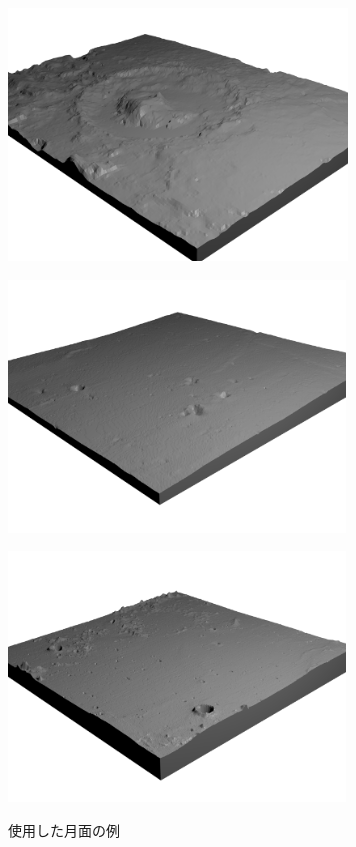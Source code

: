 \begin{figure}[htbp]
\begin{minipage}[b]{0.48\linewidth}
      \label{fig:NASA_moon3}
    \end{minipage}
    \begin{minipage}[b]{0.48\linewidth}
      \centering
      \includegraphics[keepaspectratio, scale=0.6]{images/NASA_moon5.png}
      \label{fig:NASA_moon5}
    \end{minipage}
    \begin{minipage}[b]{0.48\linewidth}
        \centering
        \includegraphics[keepaspectratio, scale=0.6]{images/NASA_moon6.png}
        \label{fig:NASA_moon6}
      \end{minipage}
      \begin{minipage}[b]{0.48\linewidth}
        \centering
        \includegraphics[keepaspectratio, scale=0.6]{images/NASA_moon7.png}
        \label{fig:NASA_moon7}
      \end{minipage}
    \caption{使用した月面の例}\label{fig:NASA_moons}
  \end{figure}

